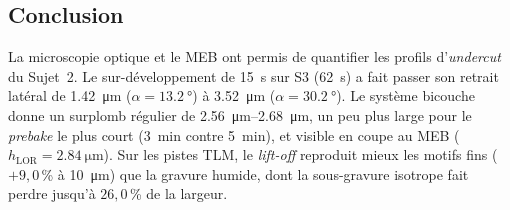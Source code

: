 \subsection{Conclusion}
La microscopie optique et le MEB ont permis de quantifier les profils d'\emph{undercut} du Sujet~2. Le sur-développement de \qty{15}{\second} sur S3 (\qty{62}{\second}) a fait passer son retrait latéral de \qty{1,42}{\micro\metre} ($\alpha = \qty{13,2}{\degree}$) à \qty{3,52}{\micro\metre} ($\alpha = \qty{30,2}{\degree}$). Le système bicouche donne un surplomb régulier de \qtyrange{2,56}{2,68}{\micro\metre}, un peu plus large pour le \emph{prebake} le plus court (\qty{3}{\minute} contre \qty{5}{\minute}), et visible en coupe au MEB ($h_{\text{LOR}} = \qty{2,84}{\micro\metre}$). Sur les pistes TLM, le \emph{lift-off} reproduit mieux les motifs fins ($+9{,}0$\,\% à \qty{10}{\micro\metre}) que la gravure humide, dont la sous-gravure isotrope fait perdre jusqu'à $26{,}0$\,\% de la largeur.
